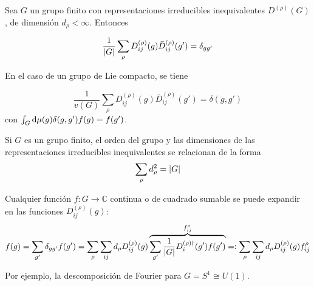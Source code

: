 \begin{relacion}[Completitud]
Sea $G$ un grupo finito con representaciones irreducibles inequivalentes $D^{(\rho)}(G)$, de dimensión $d_\rho < \infty$. Entonces

\begin{equation}
\frac{1}{\left\lvert G\right\rvert}\sum_{\rho} D_{ij}^{(\rho)} (g) \bar{D}_{ij}^{(\rho)}(g')= \delta_{gg'} \label{relacion_completitud_finito}
\end{equation} 

En el caso de un grupo de Lie compacto, se tiene

\begin{equation}
\frac{1}{v(G)}\sum_{\rho} D_{ij}^{(\rho)} (g) \bar{D}_{ij}^{(\rho)}(g')= \delta(g,g') \label{relacion_completitud_compacto}
\end{equation} 
con $\int_G \mathrm{d} \mu(g) \delta (g,g') f(g)=f(g')$.
\end{relacion}

\begin{corolario}
Si $G$ es un grupo finito, el orden del grupo y las dimensiones de las representaciones irreducibles inequivalentes se relacionan de la forma
\begin{equation}
\sum_\rho d_\rho^2=\left\lvert G\right\rvert \label{orden_dimensiones_representaciones}
\end{equation} 
\end{corolario}

\begin{teorema}
Cualquier función $f:G\rightarrow \mathbb{C}$ continua o de cuadrado sumable se puede expandir en las funciones $D_{ij}^{(\rho)}(g)$:
\begin{equation}
f(g)=\sum_{g'}\delta_{gg'}f(g')=\sum_\rho\sum_{ij}d_\rho D_{ij}^{(\rho)} (g) \overbrace{\sum_{g'} \frac{1}{\left\lvert G\right\rvert} D_i^{(\rho)\dagger}(g')f(g')}^{f_{ij}^\rho}=:	\sum_\rho\sum_{ij}d_\rho D_{ij}^{(\rho)} (g) f_{ij}^\rho			
\end{equation}

Por ejemplo, la descomposición de Fourier para $G=S^1\cong U(1)$.
\end{teorema}

